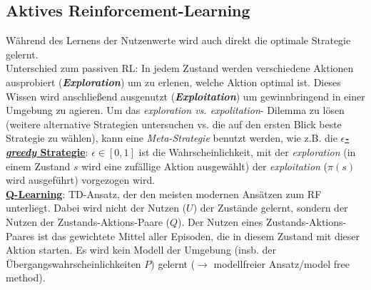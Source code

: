 \subsection{Aktives Reinforcement-Learning}
\label{aktivesRL}
Während des Lernens der Nutzenwerte wird auch direkt die optimale Strategie gelernt.\\

Unterschied zum passiven RL: In jedem Zustand werden verschiedene Aktionen ausprobiert (\emph{\textbf{Exploration}}) um zu erlenen, welche Aktion optimal ist. Dieses Wissen wird anschließend ausgenutzt (\emph{\textbf{Exploitation}}) um gewinnbringend in einer Umgebung zu agieren. Um das \emph{exploration vs. expolitation}- Dilemma zu lösen (weitere alternative Strategien untersuchen vs. die auf den ersten Blick beste Strategie zu wählen), kann eine \emph{Meta-Strategie} benutzt werden, wie z.B. die \underline{\textbf{$\epsilon$\emph{-greedy} Strategie}}: $\epsilon\in[0,1]$ ist die Wahrscheinlichkeit, mit der \emph{exploration} (in einem Zustand $s$ wird eine zufällige Aktion ausgewählt) der \emph{exploitation} ($\pi(s)$ wird ausgeführt) vorgezogen wird.\\

\underline{\textbf{Q-Learning}}: TD-Ansatz, der den meisten modernen Ansätzen zum RF unterliegt. Dabei wird nicht der Nutzen ($U$) der Zustände gelernt, sondern der Nutzen der Zustands-Aktions-Paare ($Q$). Der Nutzen eines Zustands-Aktions-Paares ist das gewichtete Mittel aller Episoden, die in diesem Zustand mit dieser Aktion starten. Es wird kein Modell der Umgebung (insb. der Übergangswahrscheinlichkeiten $P$) gelernt ($\rightarrow$ modellfreier Ansatz/model free method). \\